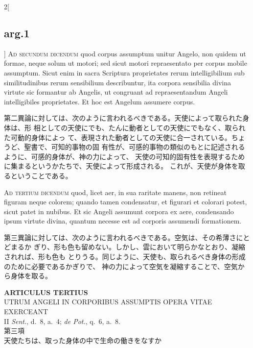\documentclass[paper=a4paper,fontsize=10pt,jafontsize=9pt,titlepage]{jlreq}
\begin{document}
\begin{paracol}{2}[\subsection{arg.1}]
{\scshape Ad secundum dicendum} quod corpus assumptum unitur Angelo, non quidem
ut formae, neque solum ut motori; sed sicut motori repraesentato per corpus
mobile assumptum. Sicut enim in sacra Scriptura proprietates rerum
intelligibilium sub similitudinibus rerum sensibilium describuntur, ita corpora
sensibilia divina virtute sic formantur ab Angelis, ut congruant ad
repraesentandum Angeli intelligibiles proprietates. Et hoc est Angelum assumere
corpus.

\switchcolumn

第二異論に対しては、次のように言われるべきである。天使によって取られた身体は、形
相としての天使にでも、たんに動者としての天使にでもなく、取られた可動的身体によっ
て、表現された動者としての天使に合一されている。ちょうど、聖書で、可知的事物の固
有性が、可感的事物の類似のもとに記述されるように、可感的身体が、神の力によって、
天使の可知的固有性を表現するために集まるというかたちで、天使によって形成される。
これが、天使が身体を取るということである。

\switchcolumn*[\subsection{ad.3}]

{\scshape Ad tertium dicendum} quod, licet aer, in sua
raritate manens, non retineat figuram neque colorem; quando tamen
condensatur, et figurari et colorari potest, sicut patet in nubibus. Et
sic Angeli assumunt corpora ex aere, condensando ipsum virtute divina,
quantum necesse est ad corporis assumendi formationem.

\switchcolumn

第三異論に対しては、次のように言われるべきである。空気は、その希薄さにとどまるか
ぎり、形も色も留めない。しかし、雲において明らかなとおり、凝縮されれば、形も色も
とりうる。同じように、天使も、取られるべき身体の形成のために必要であるかぎりで、
神の力によって空気を凝縮することで、空気から身体を取る。

\end{paracol}
\newpage
{}
{}
\setcounter{section}{3}
\setcounter{subsection}{0}




\begin{center}
 {\Large {\bfseries ARTICULUS TERTIUS}}\\
 {\large UTRUM ANGELI IN CORPORIBUS ASSUMPTIS OPERA VITAE EXERCEANT}\\
 {\footnotesize II {\itshape Sent.}, d.~8, a.~4; {\itshape de Pot.},
 q.~6, a.~8.}\\
 {\Large 第三項\\天使たちは、取った身体の中で生命の働きをなすか}
\end{center}
\end{document}
